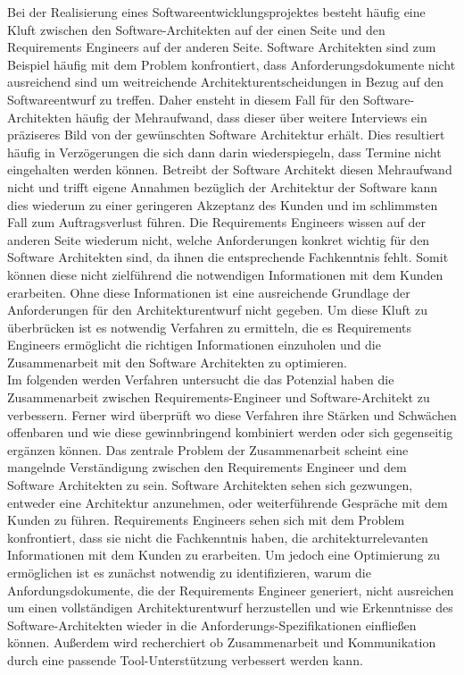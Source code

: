 Bei der Realisierung eines Softwareentwicklungsprojektes besteht häufig eine Kluft zwischen den Software-Architekten auf der einen Seite und den Requirements Engineers auf der anderen Seite. Software Architekten sind zum Beispiel häufig mit dem Problem konfrontiert, dass Anforderungsdokumente nicht ausreichend sind um weitreichende Architekturentscheidungen in Bezug auf den Softwareentwurf zu treffen. Daher ensteht in diesem Fall für den Software-Architekten häufig der Mehraufwand, dass dieser über weitere Interviews ein präziseres Bild von der gewünschten Software Architektur erhält. Dies resultiert häufig in Verzögerungen die sich dann darin wiederspiegeln, dass Termine nicht eingehalten werden können. Betreibt der Software Architekt diesen Mehraufwand nicht und trifft eigene Annahmen bezüglich der Architektur der Software kann dies wiederum zu einer geringeren Akzeptanz des Kunden und im schlimmsten Fall zum Auftragsverlust führen. Die Requirements Engineers wissen auf der anderen Seite wiederum nicht, welche Anforderungen konkret wichtig für den Software Architekten sind, da ihnen die entsprechende Fachkenntnis fehlt. Somit können diese nicht zielführend die notwendigen Informationen mit dem Kunden erarbeiten. Ohne diese Informationen ist eine ausreichende Grundlage der Anforderungen für den Architekturentwurf nicht gegeben. Um diese Kluft zu überbrücken ist es notwendig Verfahren zu ermitteln, die es Requirements Engineers ermöglicht die richtigen Informationen einzuholen und die Zusammenarbeit mit den Software Architekten zu optimieren.\\

Im folgenden werden Verfahren untersucht die das Potenzial haben die Zusammenarbeit zwischen Requirements-Engineer und Software-Architekt zu verbessern. Ferner wird überprüft wo diese Verfahren ihre Stärken und Schwächen offenbaren und wie diese gewinnbringend kombiniert werden oder sich gegenseitig ergänzen können. Das zentrale Problem der Zusammenarbeit scheint eine mangelnde Verständigung zwischen den Requirements Engineer und dem Software Architekten zu sein. Software Architekten sehen sich gezwungen, entweder eine Architektur anzunehmen, oder weiterführende Gespräche mit dem Kunden zu führen. Requirements Engineers sehen sich mit dem Problem konfrontiert, dass sie nicht die Fachkenntnis haben, die architekturrelevanten Informationen mit dem Kunden zu erarbeiten. Um jedoch eine Optimierung zu ermöglichen ist es zunächst notwendig zu identifizieren, warum die Anfordungsdokumente, die der Requirements Engineer generiert, nicht ausreichen um einen vollständigen Architekturentwurf herzustellen und wie Erkenntnisse des Software-Architekten wieder in die Anforderungs-Spezifikationen einfließen können. Außerdem wird recherchiert ob Zusammenarbeit und Kommunikation durch eine passende Tool-Unterstützung verbessert werden kann.\\

